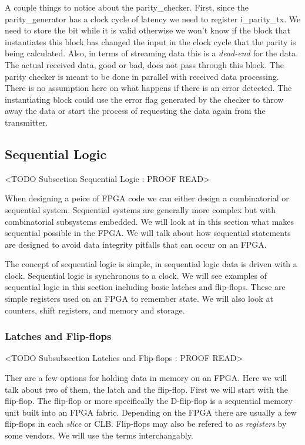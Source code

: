 A couple things to notice about the parity\_checker. First, since the parity\_generator has a clock cycle of latency we need to register i\_parity\_tx. We need to store the bit while it is valid otherwise we won't know if the block that instantiates this block has changed the input in the clock cycle that the parity is being calculated. Also, in terms of streaming data this is a \emph{dead-end} for the data. The actual received data, good or bad, does not pass through this block. The parity checker is meant to be done in parallel with received data processing. There is no assumption here on what happens if there is an error detected. The instantiating block could use the error flag generated by the checker to throw away the data or start the process of requesting the data again from the transmitter. 

\subsection{Sequential Logic}
	<TODO Subsection Sequential Logic : PROOF READ>
	
When designing a peice of \ac{FPGA} code we can either design a combinatorial or sequential system. Sequential systems are generally more complex but with combinatorial subsystems embedded. We will look at in this section what makes sequential possible in the \ac{FPGA}. We will talk about how sequential statements are designed to avoid data integrity pitfalls that can occur on an \ac{FPGA}.
	
The concept of sequential logic is simple, in sequential logic data is driven with a clock. Sequential logic is synchronous to a clock. We will see examples of sequential logic in this section including basic latches and flip-flops. These are simple registers used on an \ac{FPGA} to remember state. We will also look at counters, shift registers, and memory and storage. 	
	
	
\subsubsection{Latches and Flip-flops}
	<TODO Subsubsection  Latches and Flip-flops : PROOF READ>

Ther are a few options for holding data in memory on an \ac{FPGA}. Here we will talk about two of them, the latch and the flip-flop. First we will start with the flip-flop. The flip-flop or more specifically the D-flip-flop is a sequential memory unit built into an \ac{FPGA} fabric. Depending on the \ac{FPGA} there are usually a few flip-flops in each \emph{slice} or \ac{CLB}. Flip-flops may also be refered to as \emph{registers} by some vendors. We will use the terms interchangably. 

